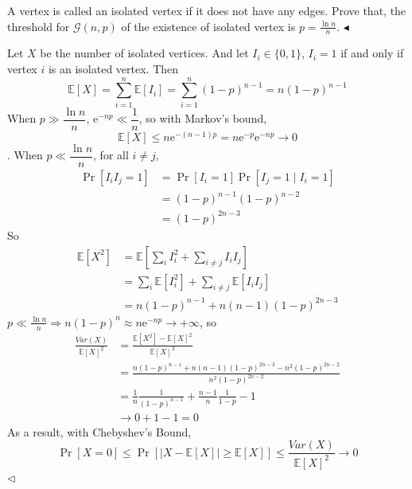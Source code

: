\documentclass[11pt]{article}
\newenvironment{problem}[2][Problem]{\begin{trivlist}
\item[\hskip \labelsep {\bfseries #1}\hskip \labelsep {\bfseries #2.}]}{\hfill$\blacktriangleleft$\end{trivlist}}
\newenvironment{answer}[1][Answer]{\begin{trivlist}
\item[\hskip \labelsep {\bfseries #1.}\hskip \labelsep]}{\hfill$\lhd$\end{trivlist}}
\newcommand\E{\mathbb{E}}
\begin{document}
\begin{problem}{6 (20')}
A vertex is called an isolated vertex if it does not have any edges. Prove that, the threshold for $\mathcal{G}(n,p)$ of the existence of isolated vertex is $p=\frac{\ln n}{n}$.
\end{problem}

\begin{answer}
    Let $X$ be the number of isolated vertices. And let $I_i \in \{0, 1\}$, $I_i = 1$ if and only if vertex $i$ is an isolated vertex. Then
    \[\E[X] = \sum_{i=1}^n \E[I_i] = \sum_{i=1}^n (1-p)^{n-1} = n(1-p)^{n-1}\]
    When $p \gg \dfrac{\ln n}{n}$, $\mathrm{e}^{-np} \ll \dfrac{1}{n}$, so with Markov's bound, 
    \[\displaystyle{\E[X] \le n\mathrm{e}^{-(n-1)p} = n \mathrm{e}^{-p} \mathrm{e}^{-np} \to 0}\].
    When $p \ll \dfrac{\ln n}{n}$, for all $i \neq j$, 
    \begin{align*}
        \Pr[I_i I_j = 1] &= \Pr[I_i = 1] \Pr[I_j = 1 \mid I_i = 1] \\
        &= (1-p)^{n-1} (1-p)^{n-2} \\
        &= (1-p)^{2n-3}
    \end{align*}
    So
    \begin{align*}
        \E[X^2] &= \E\left[\sum_i I_i^2 + \sum_{i \neq j} I_i I_j\right] \\
        &= \sum_i \E[I_i^2] + \sum_{i\neq j} \E[I_i I_j] \\
        &= n(1-p)^{n-1} + n(n-1)(1-p)^{2n-3}
    \end{align*}
    $p \ll \frac{\ln n}{n} \Longrightarrow n(1-p)^n \approx n\mathrm{e}^{-np} \to +\infty$, so
    \begin{align*}
        \frac{Var(X)}{\E[X]^2} &= \frac{\E[X^2] - \E[X]^2}{\E[X]^2}\\
        &= \frac{n(1-p)^{n-1} + n(n-1)(1-p)^{2n-3} - n^2(1-p)^{2n-2}}{n^2(1-p)^{2n-2}} \\
        &= \frac{1}{n} \frac{1}{(1-p)^{n-1}} + \frac{n-1}{n} \frac{1}{1-p} - 1 \\
        &\to 0 + 1 - 1 = 0
    \end{align*}
    As a result, with Chebyshev's Bound, 
    \[\Pr[X = 0] \le \Pr\left[|X - \E[X]| \ge \E[X]\right] \le  \frac{Var(X)}{\E[X]^2} \to 0\]
\end{answer}
\end{document}
